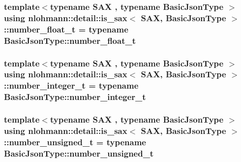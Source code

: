 \subsubsection[{\texorpdfstring{number\+\_\+float\+\_\+t}{number_float_t}}]{\setlength{\rightskip}{0pt plus 5cm}template$<$typename S\+AX , typename Basic\+Json\+Type $>$ using {\bf nlohmann\+::detail\+::is\+\_\+sax}$<$ S\+AX, Basic\+Json\+Type $>$\+::{\bf number\+\_\+float\+\_\+t} =  typename Basic\+Json\+Type\+::number\+\_\+float\+\_\+t\hspace{0.3cm}{\ttfamily [private]}}\hypertarget{structnlohmann_1_1detail_1_1is__sax_a58d3205c8d3c7a01cc330374fa7976c5}{}\label{structnlohmann_1_1detail_1_1is__sax_a58d3205c8d3c7a01cc330374fa7976c5}
\subsubsection[{\texorpdfstring{number\+\_\+integer\+\_\+t}{number_integer_t}}]{\setlength{\rightskip}{0pt plus 5cm}template$<$typename S\+AX , typename Basic\+Json\+Type $>$ using {\bf nlohmann\+::detail\+::is\+\_\+sax}$<$ S\+AX, Basic\+Json\+Type $>$\+::{\bf number\+\_\+integer\+\_\+t} =  typename Basic\+Json\+Type\+::number\+\_\+integer\+\_\+t\hspace{0.3cm}{\ttfamily [private]}}\hypertarget{structnlohmann_1_1detail_1_1is__sax_aa9a29390ca9810cee149510f586f5573}{}\label{structnlohmann_1_1detail_1_1is__sax_aa9a29390ca9810cee149510f586f5573}
\subsubsection[{\texorpdfstring{number\+\_\+unsigned\+\_\+t}{number_unsigned_t}}]{\setlength{\rightskip}{0pt plus 5cm}template$<$typename S\+AX , typename Basic\+Json\+Type $>$ using {\bf nlohmann\+::detail\+::is\+\_\+sax}$<$ S\+AX, Basic\+Json\+Type $>$\+::{\bf number\+\_\+unsigned\+\_\+t} =  typename Basic\+Json\+Type\+::number\+\_\+unsigned\+\_\+t\hspace{0.3cm}{\ttfamily [private]}}\hypertarget{structnlohmann_1_1detail_1_1is__sax_a655c9b8038e51e5b9211e2419118644d}{}\label{structnlohmann_1_1detail_1_1is__sax_a655c9b8038e51e5b9211e2419118644d}
